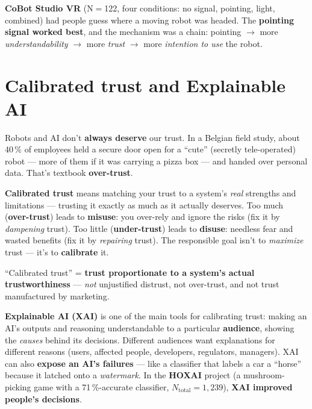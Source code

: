 \documentclass[11pt, oneside]{book}
\begin{document}
\textbf{CoBot Studio VR} (N$=$122, four conditions: no signal, pointing, light,
combined) had people guess where a moving robot was headed. The
\textbf{pointing signal worked best}, and the mechanism was a chain: pointing
$\to$ more \emph{understandability} $\to$ more \emph{trust} $\to$ more
\emph{intention to use} the robot.

\section{Calibrated trust and Explainable AI}

Robots and AI don't \textbf{always deserve} our trust. In a Belgian field
study, about 40\,\% of employees held a secure door open for a ``cute''
(secretly tele-operated) robot — more of them if it was carrying a pizza box —
and handed over personal data. That's textbook \textbf{over-trust}.

\begin{defbox}[title={Calibrated trust — exam favourite}]
\textbf{Calibrated trust} means matching your trust to a system's \emph{real}
strengths and limitations — trusting it exactly as much as it actually
deserves. Too much (\textbf{over-trust}) leads to \textbf{misuse}: you
over-rely and ignore the risks (fix it by \emph{dampening} trust). Too little
(\textbf{under-trust}) leads to \textbf{disuse}: needless fear and wasted
benefits (fix it by \emph{repairing} trust). The responsible goal isn't to
\emph{maximize} trust — it's to \textbf{calibrate} it.
\end{defbox}

\begin{notebox}[title={Single-choice trap (from the sample exam)}]
``Calibrated trust'' = \textbf{trust proportionate to a system's actual
trustworthiness} — \emph{not} unjustified distrust, not over-trust, and not
trust manufactured by marketing.
\end{notebox}

\textbf{Explainable AI (XAI)} is one of the main tools for calibrating trust:
making an AI's outputs and reasoning understandable to a particular
\textbf{audience}, showing the \emph{causes} behind its decisions. Different
audiences want explanations for different reasons (users, affected people,
developers, regulators, managers). XAI can also \textbf{expose an AI's
failures} — like a classifier that labels a car a ``horse'' because it latched
onto a \emph{watermark}. In the \textbf{HOXAI} project (a mushroom-picking game
with a 71\,\%-accurate classifier, $N_{\text{total}}=1{,}239$), \textbf{XAI
improved people's decisions}.
\end{document}
